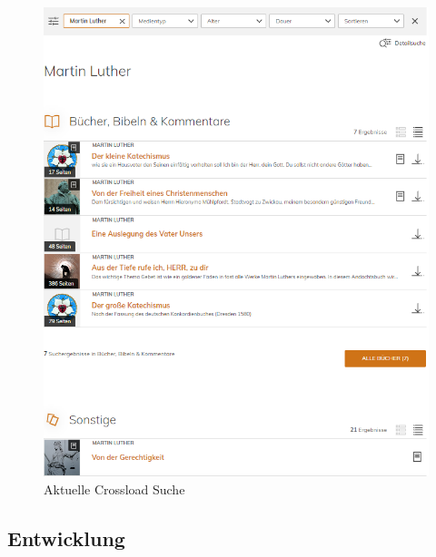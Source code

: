 \begin{figure}[ht!]
  \begin{centering}
    \includegraphics[width=.8\textwidth]{figures/appendix/crossloadSuche.png}
    \caption{Aktuelle Crossload Suche \cite{pfleiderer2022}}
    \label{fig:crossloadSuche}
  \end{centering}
\end{figure}

\clearpage
\subsection{Entwicklung}

